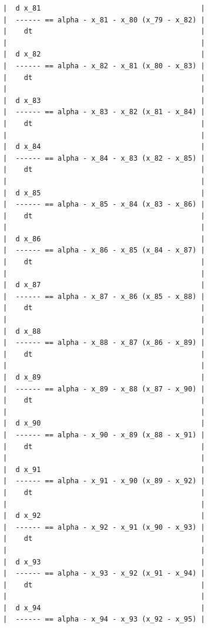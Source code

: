 {\begin{verbatim}
|  d x_81                                      |
|  ------ == alpha - x_81 - x_80 (x_79 - x_82) |
|    dt                                        |
|                                              |
|  d x_82                                      |
|  ------ == alpha - x_82 - x_81 (x_80 - x_83) |
|    dt                                        |
|                                              |
|  d x_83                                      |
|  ------ == alpha - x_83 - x_82 (x_81 - x_84) |
|    dt                                        |
|                                              |
|  d x_84                                      |
|  ------ == alpha - x_84 - x_83 (x_82 - x_85) |
|    dt                                        |
|                                              |
|  d x_85                                      |
|  ------ == alpha - x_85 - x_84 (x_83 - x_86) |
|    dt                                        |
|                                              |
|  d x_86                                      |
|  ------ == alpha - x_86 - x_85 (x_84 - x_87) |
|    dt                                        |
|                                              |
|  d x_87                                      |
|  ------ == alpha - x_87 - x_86 (x_85 - x_88) |
|    dt                                        |
|                                              |
|  d x_88                                      |
|  ------ == alpha - x_88 - x_87 (x_86 - x_89) |
|    dt                                        |
|                                              |
|  d x_89                                      |
|  ------ == alpha - x_89 - x_88 (x_87 - x_90) |
|    dt                                        |
|                                              |
|  d x_90                                      |
|  ------ == alpha - x_90 - x_89 (x_88 - x_91) |
|    dt                                        |
|                                              |
|  d x_91                                      |
|  ------ == alpha - x_91 - x_90 (x_89 - x_92) |
|    dt                                        |
|                                              |
|  d x_92                                      |
|  ------ == alpha - x_92 - x_91 (x_90 - x_93) |
|    dt                                        |
|                                              |
|  d x_93                                      |
|  ------ == alpha - x_93 - x_92 (x_91 - x_94) |
|    dt                                        |
|                                              |
|  d x_94                                      |
|  ------ == alpha - x_94 - x_93 (x_92 - x_95) |

\end{verbatim}}
